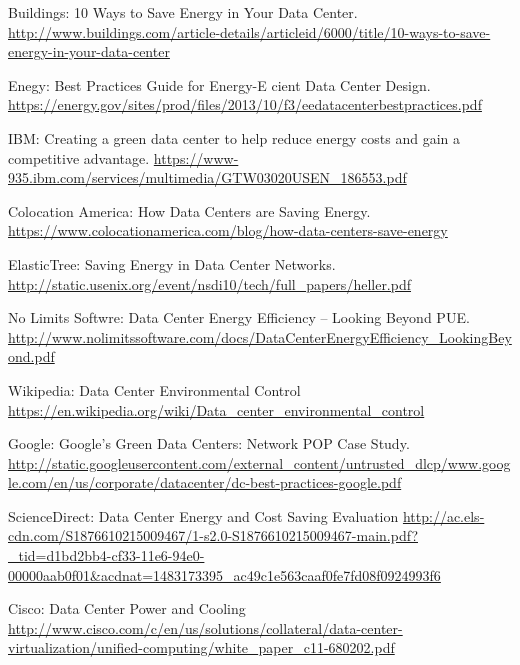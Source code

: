 \documentclass[12pt]{article}
\begin{document}
\begin{thebibliography}{9}
    Buildings: 10 Ways to Save Energy in Your Data Center. \newline \url{http://www.buildings.com/article-details/articleid/6000/title/10-ways-to-save-energy-in-your-data-center}

		Enegy: Best Practices Guide for Energy-E cient Data Center Design. \newline
		\url{https://energy.gov/sites/prod/files/2013/10/f3/eedatacenterbestpractices.pdf}

		IBM: Creating a green data center to help reduce energy costs and gain a competitive advantage. \newline
		\url{https://www-935.ibm.com/services/multimedia/GTW03020USEN_186553.pdf}

		Colocation America: How Data Centers are Saving Energy. \newline
		\url{https://www.colocationamerica.com/blog/how-data-centers-save-energy}

		ElasticTree: Saving Energy in Data Center Networks. \newline
		\url{http://static.usenix.org/event/nsdi10/tech/full_papers/heller.pdf}

		No Limits Softwre: Data Center Energy Efficiency – Looking Beyond PUE. \newline
		\url{http://www.nolimitssoftware.com/docs/DataCenterEnergyEfficiency_LookingBeyond.pdf}

		Wikipedia: Data Center Environmental Control \newline
		\url{https://en.wikipedia.org/wiki/Data_center_environmental_control}

		Google: Google’s Green Data Centers: Network POP Case Study.\newline
		\url{http://static.googleusercontent.com/external_content/untrusted_dlcp/www.google.com/en/us/corporate/datacenter/dc-best-practices-google.pdf}

		ScienceDirect: Data Center Energy and Cost Saving Evaluation \newline
		\url{http://ac.els-cdn.com/S1876610215009467/1-s2.0-S1876610215009467-main.pdf?_tid=d1bd2bb4-cf33-11e6-94e0-00000aab0f01&acdnat=1483173395_ac49c1e563caaf0fe7fd08f0924993f6}

		Cisco: Data Center Power and Cooling \newline
		\url{http://www.cisco.com/c/en/us/solutions/collateral/data-center-virtualization/unified-computing/white_paper_c11-680202.pdf}


\end{thebibliography}
\end{document}
